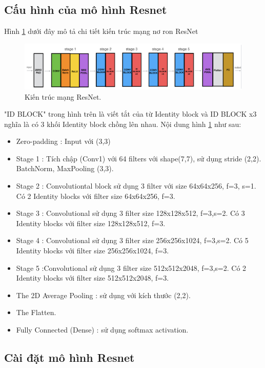\subsection{Cấu hình của mô hình Resnet}
Hình \ref{fig:resnet_architecture} dưới đây mô tả chi tiết kiến trúc mạng nơ ron ResNet
\begin{figure}[H]
	\centering
	\includegraphics[width=1\linewidth]{images/resnet_architecture}
	\caption{Kiến trúc mạng ResNet.}
	\label{fig:resnet_architecture}
\end{figure}
"ID BLOCK" trong hình trên là viết tắt của từ Identity block và ID BLOCK x3 nghĩa là có 3 khối Identity block chồng lên nhau. Nội dung hình \ref{fig:resnet_architecture} như sau:
\begin{itemize}
	\item Zero-padding : Input với (3,3)
	\item Stage 1 : Tích chập (Conv1) với 64 filters với shape(7,7), sử dụng stride (2,2). BatchNorm, MaxPooling (3,3).
	\item Stage 2 : Convolutiontal block sử dụng 3 filter với size 64x64x256, f=3, s=1. Có 2 Identity blocks với filter size 64x64x256, f=3.
	\item Stage 3 : Convolutional sử dụng 3 filter size 128x128x512, f=3,s=2. Có 3 Identity blocks với filter size 128x128x512, f=3.
	\item Stage 4 : Convolutional sử dụng 3 filter size 256x256x1024, f=3,s=2. Có 5 Identity blocks với filter size 256x256x1024, f=3.
	\item Stage 5 :Convolutional sử dụng 3 filter size 512x512x2048, f=3,s=2. Có 2 Identity blocks với filter size 512x512x2048, f=3.
	\item The 2D Average Pooling : sử dụng với kích thước (2,2).
	\item The Flatten.
	\item Fully Connected (Dense) : sử dụng softmax activation.
\end{itemize}

\subsection{Cài đặt mô hình Resnet}


